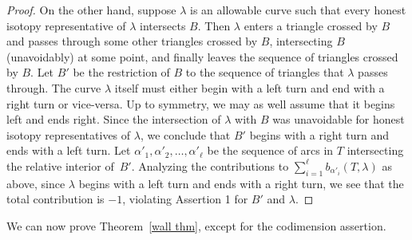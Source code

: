 \documentclass{amsart}
\theoremstyle{definition}
\theoremstyle{remark}
\numberwithin{equation}{section}
\newcommand{\0}{{\mathbf{0}}}
\begin{document}
\begin{proof}
On the other hand, suppose $\lambda$ is an allowable curve such that every honest isotopy representative of $\lambda$ intersects $B$.
Then $\lambda$ enters a triangle crossed by $B$ and passes through some other triangles crossed by $B$, intersecting $B$ (unavoidably) at some point, and finally leaves the sequence of triangles crossed by $B$.
Let $B'$ be the restriction of $B$ to the sequence of triangles that $\lambda$ passes through. 
The curve $\lambda$ itself must either begin with a left turn and end with a right turn or vice-versa. 
Up to symmetry, we may as well assume that it begins left and ends right.
Since the intersection of $\lambda$ with $B$ was unavoidable for honest isotopy representatives of $\lambda$, we conclude that $B'$ begins with a right turn and ends with a left turn.
Let $\alpha'_1, \alpha'_2,\ldots,\alpha'_\ell$ be the sequence of arcs in $T$ intersecting the relative interior of~$B'$.
Analyzing the contributions to $\sum_{i=1}^\ell b_{\alpha'_i}(T,\lambda)$ as above, since $\lambda$ begins with a left turn and ends with a right turn, we see that the total contribution is $-1$, violating Assertion 1 for $B'$ and $\lambda$.
\end{proof}

We can now prove Theorem~\ref{wall thm}, except for the codimension assertion.
\end{document}
